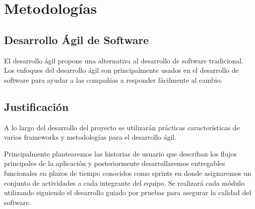 \clearpage
\chapter{Metodologías}

\section{Desarrollo Ágil de Software}

El desarrollo ágil propone una alternativa al desarrollo de software tradicional. Los enfoques del desarrollo ágil son principalmente usados en el desarrollo de software para ayudar a las compañias a responder fácilmente al cambio. 

\section{Justificación}

A lo largo del desarrollo del proyecto se utilizarán prácticas características de varios frameworks y metodologías para el desarrollo ágil.

Principalmente plantearemos las historias de usuario que describan los flujos principales de la aplicación y posteriormente desarrollaremos entregables funcionales en plazos de tiempo conocidos como sprints en donde asignaremos un conjunto de actividades a cada integrante del equipo. Se realizará cada módulo utilizando siguiendo el desarrollo guiado por pruebas para asegurar la calidad del software. 


